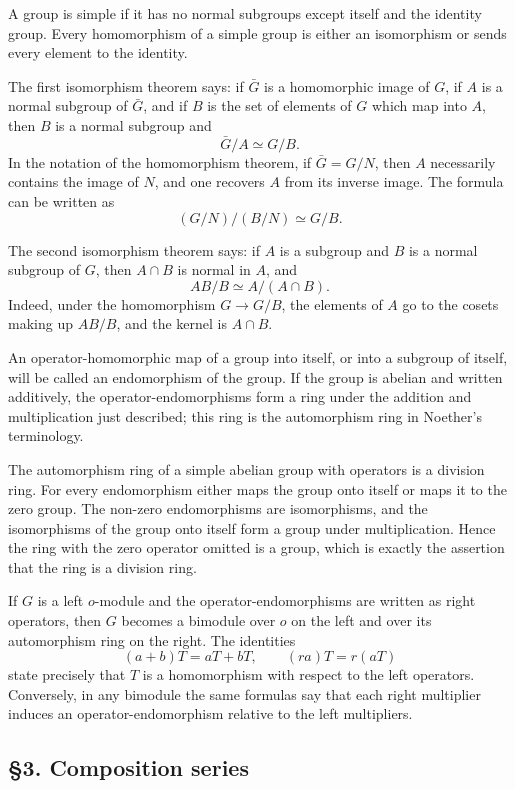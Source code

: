 \documentclass[11pt]{article}
\begin{document}
A group is simple if it has no normal subgroups except itself and the
identity group. Every homomorphism of a simple group is either an
isomorphism or sends every element to the identity.

The first isomorphism theorem says: if \(\bar G\) is a homomorphic image
of \(G\), if \(A\) is a normal subgroup of \(\bar G\), and if \(B\) is
the set of elements of \(G\) which map into \(A\), then \(B\) is a
normal subgroup and \[
  \bar G/A\simeq G/B.
\] In the notation of the homomorphism theorem, if \(\bar G=G/N\), then
\(A\) necessarily contains the image of \(N\), and one recovers \(A\)
from its inverse image. The formula can be written as \[
  (G/N)/(B/N)\simeq G/B.
\]

The second isomorphism theorem says: if \(A\) is a subgroup and \(B\) is
a normal subgroup of \(G\), then \(A\cap B\) is normal in \(A\), and \[
  AB/B\simeq A/(A\cap B).
\] Indeed, under the homomorphism \(G\to G/B\), the elements of \(A\) go
to the cosets making up \(AB/B\), and the kernel is \(A\cap B\).

An operator-homomorphic map of a group into itself, or into a subgroup
of itself, will be called an endomorphism of the group. If the group is
abelian and written additively, the operator-endomorphisms form a ring
under the addition and multiplication just described; this ring is the
automorphism ring in Noether's terminology.

The automorphism ring of a simple abelian group with operators is a
division ring. For every endomorphism either maps the group onto itself
or maps it to the zero group. The non-zero endomorphisms are
isomorphisms, and the isomorphisms of the group onto itself form a group
under multiplication. Hence the ring with the zero operator omitted is a
group, which is exactly the assertion that the ring is a division ring.

If \(G\) is a left \(o\)-module and the operator-endomorphisms are
written as right operators, then \(G\) becomes a bimodule over \(o\) on
the left and over its automorphism ring on the right. The identities \[
  (a+b)T=aT+bT,
  \qquad
  (ra)T=r(aT)
\] state precisely that \(T\) is a homomorphism with respect to the left
operators. Conversely, in any bimodule the same formulas say that each
right multiplier induces an operator-endomorphism relative to the left
multipliers.

\subsection{§3. Composition series}\label{composition-series}
\end{document}
